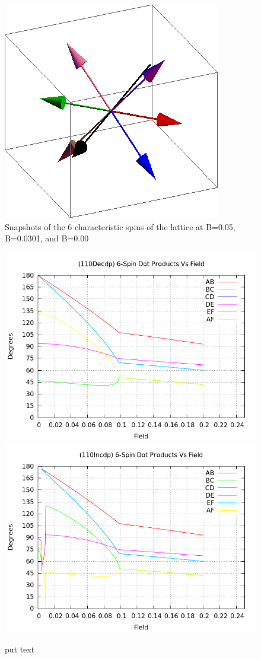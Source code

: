 \documentclass{article}
\begin{document}
\begin{figure}[ht]
\includegraphics[scale=0.27]{110/501S005to000G.png}
\caption{Snapshots of the 6 characteristic spins of the lattice at B=0.05, B=0.0301, and B=0.00}
\end{figure}
\clearpage

\begin{figure}[ht]
\centering
\includegraphics[scale=0.5]{HVariedData/Pictures/110Decdp.png}
\includegraphics[scale=0.5]{HVariedData/Pictures/110Incdp.png}
\caption{put text}
\end{figure}
\clearpage
\end{document}
